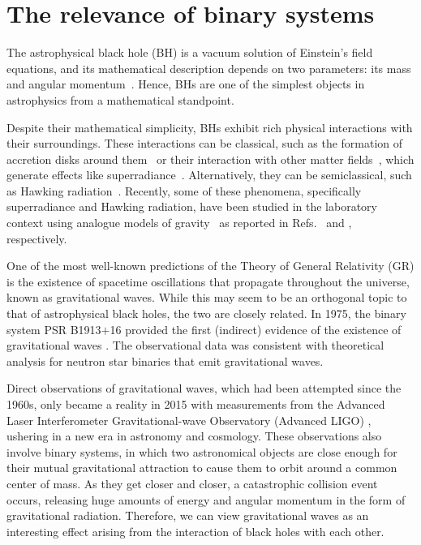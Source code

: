 \section{The relevance of binary systems}

The astrophysical black hole (\ac{BH}) is a vacuum solution of Einstein's field equations, and its mathematical description depends on two parameters: its mass and angular momentum~\cite{1986bhmp.book.....T}. Hence, \acp{BH} are one of the simplest objects in astrophysics from a mathematical standpoint.

Despite their mathematical simplicity, \acp{BH} exhibit rich physical interactions with their surroundings. These interactions can be classical, such as the formation of accretion disks around them~\cite{Abramowicz2013} or their interaction with other matter fields~\cite{Ficarra2023}, which generate effects like superradiance~\cite{PhysRevD.87.043513}. Alternatively, they can be semiclassical, such as Hawking radiation~\cite{Wald2001}. Recently, some of these phenomena, specifically superradiance and Hawking radiation, have been studied in the laboratory context using analogue models of gravity~\cite{Barcel2011} as reported in Refs.~\cite{Torres2017} and \cite{Kolobov2021}, respectively.

One of the most well-known predictions of the Theory of General Relativity (\ac{GR}) is the existence of spacetime oscillations that propagate throughout the universe, known as gravitational waves. While this may seem to be an orthogonal topic to that of astrophysical black holes, the two are closely related. In 1975, the binary system PSR B1913$+$16 provided the first (indirect) evidence of the existence of gravitational waves \cite{1975ApJ...195L..51H}. The observational data was consistent with theoretical analysis for neutron star binaries that emit gravitational waves.

Direct observations of gravitational waves, which had been attempted since the 1960s, only became a reality in 2015 with measurements from the Advanced Laser Interferometer Gravitational-wave Observatory (Advanced LIGO) \cite{grav1,grav2}, ushering in a new era in astronomy and cosmology. These observations also involve binary systems, in which two astronomical objects are close enough for their mutual gravitational attraction to cause them to orbit around a common center of mass. As they get closer and closer, a catastrophic collision event occurs, releasing huge amounts of energy and angular momentum in the form of gravitational radiation. Therefore, we can view gravitational waves as an interesting effect arising from the interaction of black holes with each other.

